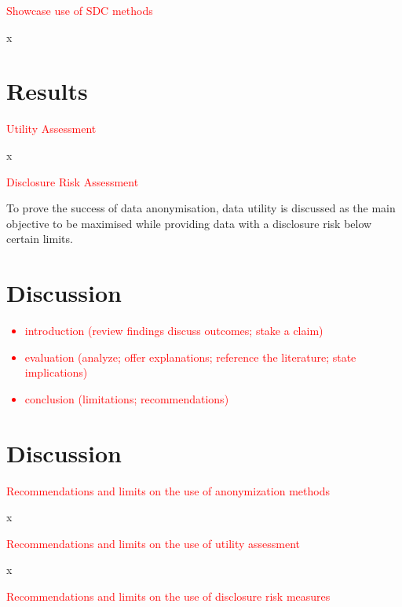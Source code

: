 \documentclass{article}
\begin{document}
\textcolor{red}{Showcase use of SDC methods}

x

\section{Results}

\textcolor{red}{Utility Assessment}

x

\textcolor{red}{Disclosure Risk Assessment}

To prove the success of data anonymisation, data utility is discussed as the main objective to be maximised while providing data with a disclosure risk below certain limits.

\section{Discussion}

\textcolor{red}{
\begin{itemize}
    \item introduction (review findings discuss outcomes; stake a claim)
    \item evaluation (analyze; offer explanations; reference the literature; state implications)    
    \item conclusion (limitations; recommendations)
\end{itemize}
} %

\section{Discussion}

\textcolor{red}{Recommendations and limits on the use of anonymization methods}
   
x

\textcolor{red}{Recommendations and limits on the use of utility assessment}

x

\textcolor{red}{Recommendations and limits on the use of disclosure risk measures}
\end{document}

